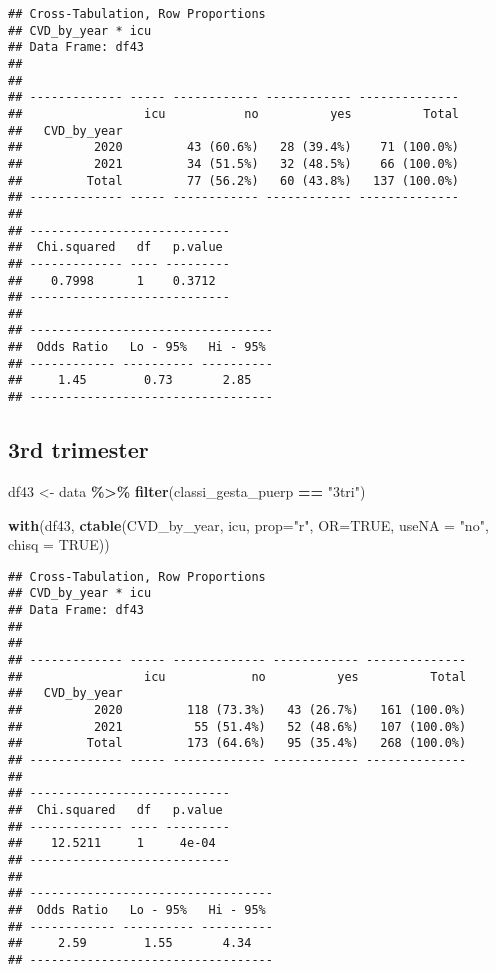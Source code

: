 \documentclass[
]{article}
\newenvironment{Shaded}{\begin{snugshade}}{\end{snugshade}}
\newcommand{\AttributeTok}[1]{\textcolor[rgb]{0.13,0.29,0.53}{#1}}
\newcommand{\ConstantTok}[1]{\textcolor[rgb]{0.56,0.35,0.01}{#1}}
\newcommand{\FunctionTok}[1]{\textcolor[rgb]{0.13,0.29,0.53}{\textbf{#1}}}
\newcommand{\NormalTok}[1]{#1}
\newcommand{\OtherTok}[1]{\textcolor[rgb]{0.56,0.35,0.01}{#1}}
\newcommand{\SpecialCharTok}[1]{\textcolor[rgb]{0.81,0.36,0.00}{\textbf{#1}}}
\newcommand{\StringTok}[1]{\textcolor[rgb]{0.31,0.60,0.02}{#1}}
\begin{document}
\begin{verbatim}
## Cross-Tabulation, Row Proportions  
## CVD_by_year * icu  
## Data Frame: df43  
## 
## 
## ------------- ----- ------------ ------------ --------------
##                 icu           no          yes          Total
##   CVD_by_year                                               
##          2020         43 (60.6%)   28 (39.4%)    71 (100.0%)
##          2021         34 (51.5%)   32 (48.5%)    66 (100.0%)
##         Total         77 (56.2%)   60 (43.8%)   137 (100.0%)
## ------------- ----- ------------ ------------ --------------
## 
## ----------------------------
##  Chi.squared   df   p.value 
## ------------- ---- ---------
##    0.7998      1    0.3712  
## ----------------------------
## 
## ----------------------------------
##  Odds Ratio   Lo - 95%   Hi - 95% 
## ------------ ---------- ----------
##     1.45        0.73       2.85   
## ----------------------------------
\end{verbatim}

\hypertarget{rd-trimester-6}{%
\subsection{3rd trimester}\label{rd-trimester-6}}

\begin{Shaded}
\begin{Highlighting}[]
\NormalTok{df43 }\OtherTok{\textless{}{-}}\NormalTok{ data }\SpecialCharTok{\%\textgreater{}\%} 
  \FunctionTok{filter}\NormalTok{(classi\_gesta\_puerp }\SpecialCharTok{==} \StringTok{"3tri"}\NormalTok{)}

\FunctionTok{with}\NormalTok{(df43, }\FunctionTok{ctable}\NormalTok{(CVD\_by\_year, icu, }\AttributeTok{prop=}\StringTok{"r"}\NormalTok{, }\AttributeTok{OR=}\ConstantTok{TRUE}\NormalTok{, }\AttributeTok{useNA =} \StringTok{"no"}\NormalTok{, }\AttributeTok{chisq =} \ConstantTok{TRUE}\NormalTok{))}
\end{Highlighting}
\end{Shaded}

\begin{verbatim}
## Cross-Tabulation, Row Proportions  
## CVD_by_year * icu  
## Data Frame: df43  
## 
## 
## ------------- ----- ------------- ------------ --------------
##                 icu            no          yes          Total
##   CVD_by_year                                                
##          2020         118 (73.3%)   43 (26.7%)   161 (100.0%)
##          2021          55 (51.4%)   52 (48.6%)   107 (100.0%)
##         Total         173 (64.6%)   95 (35.4%)   268 (100.0%)
## ------------- ----- ------------- ------------ --------------
## 
## ----------------------------
##  Chi.squared   df   p.value 
## ------------- ---- ---------
##    12.5211     1     4e-04  
## ----------------------------
## 
## ----------------------------------
##  Odds Ratio   Lo - 95%   Hi - 95% 
## ------------ ---------- ----------
##     2.59        1.55       4.34   
## ----------------------------------
\end{verbatim}
\end{document}
